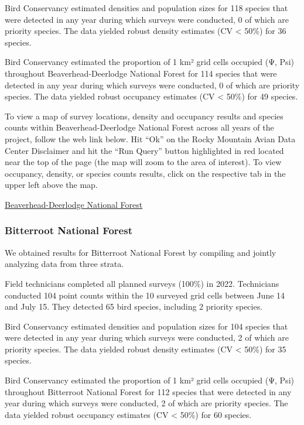 \documentclass[
  letterpaper,
  DIV=11,
  numbers=noendperiod,
  oneside]{scrreprt}
\begin{document}
Bird Conservancy estimated densities and population sizes for 118
species that were detected in any year during which surveys were
conducted, 0 of which are priority species. The data yielded robust
density estimates (CV \textless{} 50\%) for 36 species.

Bird Conservancy estimated the proportion of 1 km² grid cells occupied
(Ψ, Psi) throughout Beaverhead-Deerlodge National Forest for 114 species
that were detected in any year during which surveys were conducted, 0 of
which are priority species. The data yielded robust occupancy estimates
(CV \textless{} 50\%) for 49 species.

To view a map of survey locations, density and occupancy results and
species counts within Beaverhead-Deerlodge National Forest across all
years of the project, follow the web link below. Hit ``Ok'' on the Rocky
Mountain Avian Data Center Disclaimer and hit the ``Run Query'' button
highlighted in red located near the top of the page (the map will zoom
to the area of interest). To view occupancy, density, or species counts
results, click on the respective tab in the upper left above the map.

\href{http://www.rmbo.org/new_site/adc/QueryWindow.aspx\#N4IgzgrgDgpgTmALnAhoiBbEAuABCAIRhQDd4ALYgEwFoARGeAGwHsqBzGXAOTQEsWAOxRNcAMRZwYSEAF8gA===}{Beaverhead-Deerlodge
National Forest}

\hypertarget{bitterroot-national-forest}{%
\subsubsection{Bitterroot National
Forest}\label{bitterroot-national-forest}}

We obtained results for Bitterroot National Forest by compiling and
jointly analyzing data from three strata.

Field technicians completed all planned surveys (100\%) in 2022.
Technicians conducted 104 point counts within the 10 surveyed grid cells
between June 14 and July 15. They detected 65 bird species, including 2
priority species.

Bird Conservancy estimated densities and population sizes for 104
species that were detected in any year during which surveys were
conducted, 2 of which are priority species. The data yielded robust
density estimates (CV \textless{} 50\%) for 35 species.

Bird Conservancy estimated the proportion of 1 km² grid cells occupied
(Ψ, Psi) throughout Bitterroot National Forest for 112 species that were
detected in any year during which surveys were conducted, 2 of which are
priority species. The data yielded robust occupancy estimates (CV
\textless{} 50\%) for 60 species.
\end{document}

